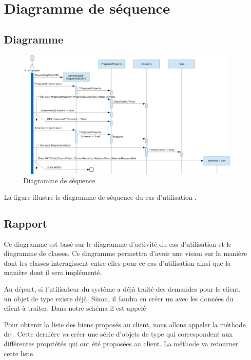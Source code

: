 \chapter{Diagramme de séquence}

\section{Diagramme}

\begin{figure}
  \centering
  \includegraphics[scale=0.6,angle=90]{IMG/id}
  \caption{Diagramme de séquence}
  \label{img_id}
\end{figure}

La figure  illustre le diagramme de séquence du cas d'utilisation \selectedusecase{}.

\section{Rapport}

Ce diagramme est basé sur le diagramme d'activité du cas d'utilisation \selectedusecase{} et le diagramme de classes. Ce diagramme permettra d'avoir une vision sur la manière dont les classes interagissent entre elles pour ce cas d'utilisation ainsi que la manière dont il sera implémenté.

Au départ, si l'utilisateur du système a déjà traité des demandes pour le client, un objet de type  existe déjà. Sinon, il faudra en créer un avec les données du client à traiter. Dans notre schéma il est appelé 

Pour obtenir la liste des biens proposés au client, nous allons appeler la méthode  de . Cette dernière va créer une série d'objets de type  qui correspondent aux différentes propriétés qui ont été proposées au client. La méthode va retourner cette liste.

